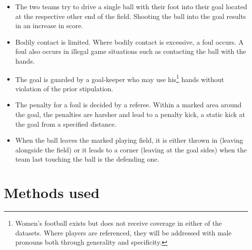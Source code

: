 \documentclass[10pt, a4paper]{UUThesisTemplate}
\begin{document}
\begin{itemize}
\item The two teams try to drive a single ball with their foot into their goal located at the respective other end of the field. Shooting the ball into the goal results in an increase in score.
\item Bodily contact is limited. Where bodily contact is excessive, a foul occurs. A foul also occurs in illegal game situations such as contacting the ball with the hands.
\item The goal is guarded by a goal-keeper who may use his\footnote{Women's football exists but does not receive coverage in either of the datasets. Where players are referenced, they will be addressed with male pronouns both through generality and specificity.} hands without violation of the prior stipulation.
\item The penalty for a foul is decided by a referee. Within a marked area around the goal, the penalties are harsher and lead to a penalty kick, a static kick at the goal from a specified distance.
\item When the ball leaves the marked playing field, it is either thrown in (leaving alongside the field) or it leads to a corner (leaving at the goal sides) when the team last touching the ball is the defending one.
\end{itemize}




\section{Methods used}
\end{document}
